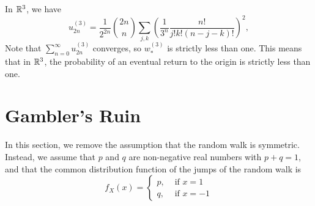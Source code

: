 In $\mathbb{R}^3$, we have 
\begin{equation*}
    u_{2 n}^{(3)}=\frac{1}{2^{2 n}}\binom{2n}{n} \sum_{j, k}\left(\frac{1}{3^{n}} \frac{n !}{j ! k !(n-j-k) !}\right)^{2}, 
\end{equation*}
Note that $\sum_{n=0}^{\infty} u_{2 n}^{(3)}$ converges, so $w_{*}^{(3)}$ is strictly less than one. This means that in $\mathbb{R}^3$, the probability of an eventual return to the origin is strictly less than one.


\section{Gambler’s Ruin}
In this section, we remove the assumption that the random walk is symmetric. Instead, we assume that $p$ and $q$ are non-negative real numbers with $p + q = 1$, and that the common distribution function of the jumps of the random walk is
\begin{equation*}
    f_{X}(x)=\left\{\begin{array}{ll}{p,} & {\text { if } x=1} \\ {q,} & {\text { if } x=-1}\end{array}\right.
\end{equation*}

